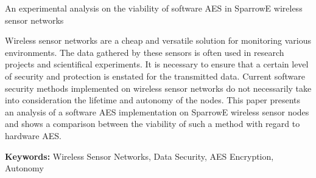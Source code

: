 An experimental analysis on the viability of software AES in SparrowE wireless sensor networks

Wireless sensor networks are a cheap and versatile solution for monitoring various environments.
The data gathered by these sensors is often used in research projects and scientifical experiments.
It is necessary to ensure that a certain level of security and protection is enstated for the transmitted 
data. Current software security methods implemented on wireless sensor networks do not necessarily take 
into consideration the lifetime and autonomy of the nodes. This paper presents an analysis of a software 
AES implementation on SparrowE wireless sensor nodes and shows a comparison between the viability of such a 
method with regard to hardware AES.

\textbf{Keywords:} Wireless Sensor Networks, Data Security, AES Encryption, Autonomy
